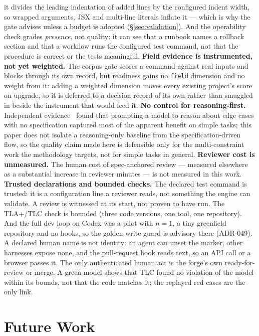 \documentclass[11pt]{article}
\begin{document}
it divides the leading indentation of added lines by the configured indent width,
so wrapped arguments, JSX and multi-line literals inflate it --- which is why the
gate advises unless a budget is adopted (\S\ref{sec:validation}). And the
operability check grades \emph{presence}, not quality: it can see that a runbook
names a rollback section and that a workflow runs the configured test command, not
that the procedure is correct or the tests meaningful.
\textbf{Field evidence is instrumented, not yet weighted.} The corpus gate scores a
command against real inputs and blocks through its own record, but readiness gains
no \texttt{field} dimension and no weight from it: adding a weighted dimension
moves every existing project's score on upgrade, so it is deferred to a decision
record of its own rather than smuggled in beside the instrument that would feed
it.
\textbf{No control for reasoning-first.} Independent evidence~\cite{garg2026spec}
found that prompting a model to reason about edge cases with no specification
captured most of the apparent benefit on simple tasks; this paper does not
isolate a reasoning-only baseline from the specification-driven flow, so the
quality claim made here is defensible only for the multi-constraint work the
methodology targets, not for simple tasks in general.
\textbf{Reviewer cost is unmeasured.} The human cost of spec-anchored review
--- measured elsewhere~\cite{garg2026spec} as a substantial increase in
reviewer minutes --- is not measured in this work.
\textbf{Trusted declarations and bounded checks.} The declared test command is
trusted: it is a configuration line a reviewer reads, not something the engine
can validate. A review is witnessed at its start, not proven to have run. The
TLA+/TLC check is bounded (three code versions, one tool, one repository). And
the full dev loop on Codex was a pilot with $n=1$, a tiny greenfield repository
and no hooks, so the golden write guard is advisory there (ADR-049). A declared human name is not identity: an agent can unset the marker, other
harnesses expose none, and the pull-request hook reads text, so an API call or a
browser passes it. The only authenticated human act is the forge's own
ready-for-review or merge. A green model shows that TLC found no violation of the model within its
bounds, not that the code matches it; the replayed red cases are the only link.

\section{Future Work}\label{sec:future}
\end{document}

